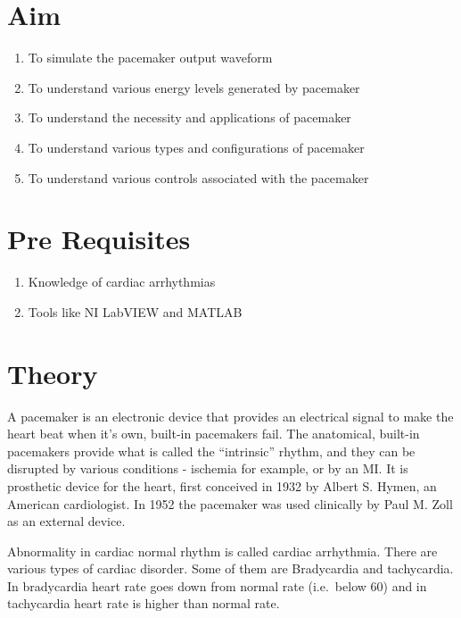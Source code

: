 \documentclass[
  11pt,
  letterpaper,
  DIV=11,
  numbers=noendperiod]{scrreprt}
\providecommand{\tightlist}{%
  \setlength{\itemsep}{0pt}\setlength{\parskip}{0pt}}\usepackage{longtable,booktabs,array}
\begin{document}
\section{Aim}\label{aim-8}

\begin{enumerate}
\def\labelenumi{\arabic{enumi}.}
\tightlist
\item
  To simulate the pacemaker output waveform
\item
  To understand various energy levels generated by pacemaker
\item
  To understand the necessity and applications of pacemaker
\item
  To understand various types and configurations of pacemaker
\item
  To understand various controls associated with the pacemaker
\end{enumerate}

\section{Pre Requisites}\label{pre-requisites-3}

\begin{enumerate}
\def\labelenumi{\arabic{enumi}.}
\tightlist
\item
  Knowledge of cardiac arrhythmias
\item
  Tools like NI LabVIEW and MATLAB
\end{enumerate}

\section{Theory}\label{theory-8}

A pacemaker is an electronic device that provides an electrical signal
to make the heart beat when it's own, built-in pacemakers fail. The
anatomical, built-in pacemakers provide what is called the ``intrinsic''
rhythm, and they can be disrupted by various conditions - ischemia for
example, or by an MI. It is prosthetic device for the heart, first
conceived in 1932 by Albert S. Hymen, an American cardiologist. In 1952
the pacemaker was used clinically by Paul M. Zoll as an external device.

Abnormality in cardiac normal rhythm is called cardiac arrhythmia. There
are various types of cardiac disorder. Some of them are Bradycardia and
tachycardia. In bradycardia heart rate goes down from normal rate
(i.e.~below 60) and in tachycardia heart rate is higher than normal
rate.
\end{document}
